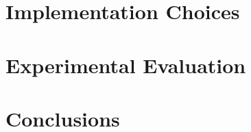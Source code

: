 \documentclass[times,9pt,article]{llncs}
\begin{document}
\section{Implementation Choices}



\section{Experimental Evaluation}


\section{Conclusions}
\end{document}

